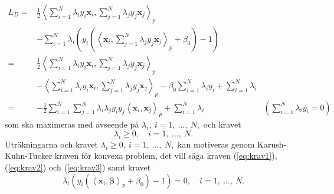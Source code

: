\documentclass[a4paper, 12pt]{report}
\theoremstyle{definition}
\theoremstyle{remark}
\newcommand{\bfbeta}{{\boldsymbol{\beta}}}
\newcommand{\bfx}{\mathbf{x}}
\newcommand{\llangle}{\left\langle}
\newcommand{\rrangle}{\right\rangle}
\newcommand{\inner}[2]{\llangle #1, #2 \rrangle}
\begin{document}
\begin{equation*}
\begin{aligned}
	L_D=&\frac{1}{2}\inner{\sum_{i=1}^{N}\lambda_i y_i \mathbf{x}_i}{ \sum_{j=1}^{N}\lambda_j y_j \mathbf{x}_j}_p&\\
	&- \sum_{i=1}^{N}\lambda_i \left( y_i \left(\inner{\mathbf{x}_i}{ \sum_{j=1}^{N}\lambda_j y_j \bfx_j}_p + \beta_0 \right) -1\right)&\\
	=& \frac{1}{2} \inner{\sum_{i=1}^{N} \lambda_i y_i \bfx_i}{\sum_{j=1}^{N} \lambda_j y_j \bfx_j}_p &\\
	&- \inner{\sum_{i=1}^{N}\lambda_i y_i \mathbf{x}_i}{\sum_{j=1}^{N} \lambda_j y_j \mathbf{x}_j}_p - \beta_0 \sum_{i=1}^{N} \lambda_i y_i  + \sum_{i=1}^{N} \lambda_i&\\
	=& -\frac{1}{2} \sum_{i=1}^{N} \sum_{j=1}^{N} \lambda_i \lambda_j y_i y_j \inner{\mathbf{x}_i}{\mathbf{x}_j}_p + \sum_{i=1}^{N} \lambda_i &\textstyle{\left(\sum\limits_{i=1}^{N}\lambda_iy_i = 0\right)}
\end{aligned}
\end{equation*}
som ska maximeras med avseende på $\lambda_i,~i=1,~\dots,~N,$ och kravet \begin{equation}\label{eq:krav3}
	\lambda_i\geq 0,\quad i=1,~\dots,~N.
\end{equation} Uträkningarna och kravet $\lambda_i\geq 0,~i=1,~\dots,~N,$ kan motiveras genom Karush-Kuhn-Tucker kraven \cite{Boyd} för konvexa problem, det vill säga kraven (\ref{eq:krav1}), (\ref{eq:krav2}) och (\ref{eq:krav3}) samt kravet %
\begin{equation}\label{eq:krav4}
	\lambda_i\left( y_i\left( \inner{\bfx_i}{\bfbeta}_p + \beta_0 \right) -1 \right) = 0,\quad i=1,~\dots,~N.
\end{equation}
\end{document}
